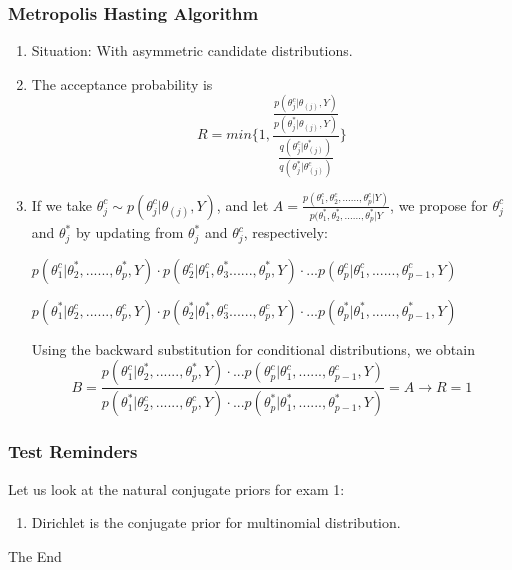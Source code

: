 \documentclass{beamer}
\begin{document}

\begin{frame}
\frametitle{Metropolis Hasting Algorithm}

\begin{enumerate}
\item Situation: With asymmetric candidate distributions.

\item The acceptance probability is 
$$R = min \Big\{1, \frac{\frac{p(\theta_j^c|\theta_{(j)},Y)}{p(\theta_j^*|\theta_{(j)},Y)}}{\frac{q(\theta_j^c|\theta_{(j)}^*)}{q(\theta_j^*|\theta_{(j)}^c)}} \Big\}$$ 

\item If we take $\theta_j^c \sim p(\theta_j^c|\theta_{(j)},Y)$, and let $A = \frac{p(\theta_1^c,\theta_2^c,......,\theta_p^c|Y)}{p(\theta_1^*,\theta_2^*,......,\theta_p^*|Y}$, we propose for $\theta_j^c$ and $\theta_j^*$ by updating from $\theta_j^*$ and $\theta_j^c$, respectively:

$p(\theta_1^c|\theta_2^*,......,\theta_p^*,Y) \cdot p(\theta_2^c|\theta_1^c,\theta_3^*......,\theta_p^*,Y) \cdot ...p(\theta_p^c|\theta_1^c,......,\theta_{p-1}^c,Y) $ 

$p(\theta_1^*|\theta_2^c,......,\theta_p^c,Y) \cdot p(\theta_2^*|\theta_1^*,\theta_3^c......,\theta_p^c,Y) \cdot ...p(\theta_p^*|\theta_1^*,......,\theta_{p-1}^*,Y)$

Using the backward substitution for conditional distributions, we obtain 
$$B = \frac{p(\theta_1^c|\theta_2^*,......,\theta_p^*,Y) \cdot ...p(\theta_p^c|\theta_1^c,......,\theta_{p-1}^c,Y)}{p(\theta_1^*|\theta_2^c,......,\theta_p^c,Y) \cdot ...p(\theta_p^*|\theta_1^*,......,\theta_{p-1}^*,Y)} = A \rightarrow R =  1$$

\end{enumerate}

\end{frame}



\begin{frame}
\frametitle{Test Reminders}

Let us look at the natural conjugate priors for exam 1:

\begin{enumerate}

\item Dirichlet is the conjugate prior for multinomial distribution.

\end{enumerate}
\end{frame}


\begin{frame}
\Huge{\centerline{The End}}
\end{frame}

\end{document}
